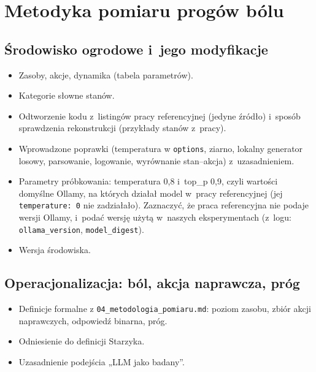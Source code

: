 
\chapter{Metodyka pomiaru progów bólu}
\label{ch:metodyka}


\section{Środowisko ogrodowe i~jego modyfikacje}
\label{sec:4-1}

\begin{planroboczy}[ok. 2 s.]
\begin{itemize}
  \item Zasoby, akcje, dynamika (tabela parametrów).
  \item Kategorie słowne stanów.
  \item Odtworzenie kodu z~listingów pracy referencyjnej (jedyne źródło) i~sposób sprawdzenia rekonstrukcji (przykłady stanów z~pracy).
  \item Wprowadzone poprawki (temperatura w \texttt{options}, ziarno, lokalny generator losowy, parsowanie, logowanie, wyrównanie stan–akcja) z~uzasadnieniem.
  \item Parametry próbkowania: temperatura 0,8 i~top\_p 0,9, czyli wartości domyślne Ollamy, na których działał model w~pracy referencyjnej (jej \texttt{temperature: 0} nie zadziałało). Zaznaczyć, że praca referencyjna nie podaje wersji Ollamy, i~podać wersję użytą w~naszych eksperymentach (z~logu: \texttt{ollama\_version}, \texttt{model\_digest}).
  \item Wersja środowiska.
\end{itemize}

\end{planroboczy}

\section{Operacjonalizacja: ból, akcja naprawcza, próg}
\label{sec:4-2}

\begin{planroboczy}[ok. 1,5 s.]
\begin{itemize}
  \item Definicje formalne z \texttt{04\_metodologia\_pomiaru.md}: poziom zasobu, zbiór akcji naprawczych, odpowiedź binarna, próg.
  \item Odniesienie do definicji Starzyka.
  \item Uzasadnienie podejścia „LLM jako badany”.
\end{itemize}

\end{planroboczy}

